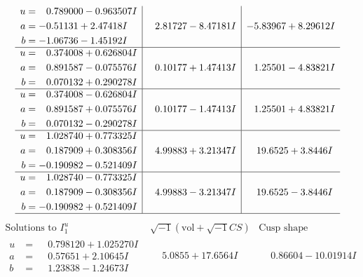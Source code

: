 \documentclass[1p]{elsarticle_modified}
\theoremstyle{definition}
\newcommand{\I}{\sqrt{-1}}
\begin{document}
$$\begin{array}{c|c|c}
\begin{aligned}
u &= \phantom{-}0.789000 - 0.963507 I \\
a &= -0.51131 + 2.47418 I \\
b &= -1.06736 - 1.45192 I\end{aligned}
 & \phantom{-}2.81727 - 8.47181 I & -5.83967 + 8.29612 I \\ \hline\begin{aligned}
u &= \phantom{-}0.374008 + 0.626804 I \\
a &= \phantom{-}0.891587 - 0.075576 I \\
b &= \phantom{-}0.070132 + 0.290278 I\end{aligned}
 & \phantom{-}0.10177 + 1.47413 I & \phantom{-}1.25501 - 4.83821 I \\ \hline\begin{aligned}
u &= \phantom{-}0.374008 - 0.626804 I \\
a &= \phantom{-}0.891587 + 0.075576 I \\
b &= \phantom{-}0.070132 - 0.290278 I\end{aligned}
 & \phantom{-}0.10177 - 1.47413 I & \phantom{-}1.25501 + 4.83821 I \\ \hline\begin{aligned}
u &= \phantom{-}1.028740 + 0.773325 I \\
a &= \phantom{-}0.187909 + 0.308356 I \\
b &= -0.190982 - 0.521409 I\end{aligned}
 & \phantom{-}4.99883 + 3.21347 I & \phantom{-}19.6525 + 3.8446 I \\ \hline\begin{aligned}
u &= \phantom{-}1.028740 - 0.773325 I \\
a &= \phantom{-}0.187909 - 0.308356 I \\
b &= -0.190982 + 0.521409 I\end{aligned}
 & \phantom{-}4.99883 - 3.21347 I & \phantom{-}19.6525 - 3.8446 I\\
 \hline 
 \end{array}$$\newpage$$\begin{array}{c|c|c}  
\text{Solutions to }I^u_{1}& \I (\text{vol} + \sqrt{-1}CS) & \text{Cusp shape}\\
 \hline 
\begin{aligned}
u &= \phantom{-}0.798120 + 1.025270 I \\
a &= \phantom{-}0.57651 + 2.10645 I \\
b &= \phantom{-}1.23838 - 1.24673 I\end{aligned}
 & \phantom{-}5.0855 + 17.6564 I & \phantom{-}0.86604 - 10.01914 I \\ \hline\begin{aligned}

\end{aligned}
\end{array}$$
\end{document}
